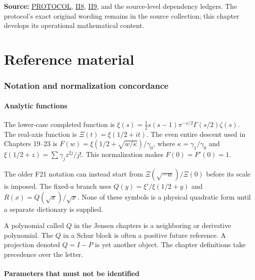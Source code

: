 \documentclass[
  10pt,
  a4paper,
  10pt,
  oneside,
  openany]{book}
\begin{document}
\textbf{Source:} \hyperref[source-protocol]{PROTOCOL},
\hyperref[source-ii8]{II8}, \hyperref[source-ii9]{II9}, and the
source-level dependency ledgers. The protocol's exact original wording
remains in the source collection; this chapter develops its operational
mathematical content.

\appendix
\part{Reference material}

\section{Notation and normalization concordance}\label{app-notation}

\subsection{Analytic functions}\label{analytic-functions}

The lower-case completed function is
\(\xi(s)=\tfrac12s(s-1)\pi^{-s/2}\Gamma(s/2)\zeta(s)\). The real-axis
function is \(\Xi(t)=\xi(1/2+it)\). The even entire descent used in
Chapters 19--23 is \(F(w)=\xi(1/2+\sqrt{w/\kappa})/\gamma_0\), where
\(\kappa=\gamma_1/\gamma_0\) and \(\xi(1/2+z)=\sum\gamma_jz^{2j}/j!\).
This normalization makes \(F(0)=F'(0)=1\).

The older F21 notation can instead start from \(\Xi(\sqrt{-w})/\Xi(0)\)
before its scale is imposed. The fixed-\(a\) branch uses
\(Q(y)=\xi'/\xi(1/2+y)\) and \(R(x)=Q(\sqrt x)/\sqrt x\). None of these
symbols is a physical quadratic form until a separate dictionary is
supplied.

A polynomial called \(Q\) in the Jensen chapters is a neighboring or
derivative polynomial. The \(Q\) in a Schur block is often a positive
future reference. A projection denoted \(Q=I-P\) is yet another object.
The chapter definitions take precedence over the letter.

\subsection{Parameters that must not be
identified}\label{parameters-that-must-not-be-identified-1}
\end{document}
